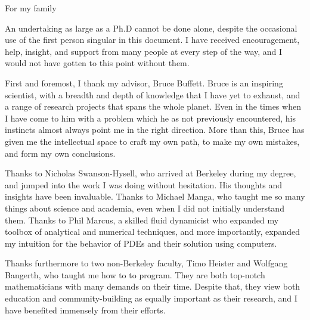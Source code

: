 \documentclass[12pt]{myucthesis}
\begin{document}
\hypersetup{pageanchor=true}
\begin{frontmatter}

\begin{dedication}
\null\vfil
{\large
\begin{center}
For my family
\end{center}}
\null\vfil
\end{dedication}

\tableofcontents
\listoffigures %
\listoftables %


\begin{acknowledgements}

An undertaking as large as a Ph.D cannot be done alone, despite the occasional
use of the first person singular in this document.
I have received encouragement, help, insight, and support from many people at every step of the way,
and I would not have gotten to this point without them.

First and foremost, I thank my advisor, Bruce Buffett.
Bruce is an inspiring scientist, with a breadth and depth of knowledge that I have yet to exhaust,
and a range of research projects that spans the whole planet.
Even in the times when I have come to him with a problem which he as not previously encountered,
his instincts almost always point me in the right direction.
More than this, Bruce has given me the intellectual space
to craft my own path, to make my own mistakes, and form my own conclusions.

Thanks to Nicholas Swanson-Hysell, who arrived at Berkeley during my degree,
and jumped into the work I was doing without hesitation.
His thoughts and insights have been invaluable.
Thanks to Michael Manga, who taught me so many things about science and academia,
even when I did not initially understand them.
Thanks to Phil Marcus, a skilled fluid dynamicist who
expanded my toolbox of analytical and numerical techniques, and more importantly,
expanded my intuition for the behavior of PDEs and their solution
using computers.

Thanks furthermore to two non-Berkeley faculty, Timo Heister and Wolfgang Bangerth, who taught me how to to program.
They are both top-notch mathematicians with many demands on their time.
Despite that, they view both education and community-building as equally important as their research,
and I have benefited immensely from their efforts.


\end{acknowledgements}
\end{frontmatter}
\end{document}

